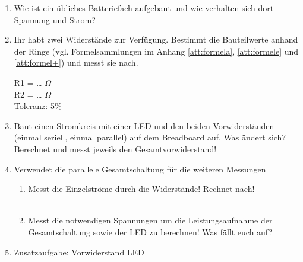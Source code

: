 
\begin{enumerate}
  \item Wie ist ein übliches Batteriefach aufgebaut und wie verhalten sich dort
    Spannung und Strom? \\
  \item Ihr habt zwei Widerstände zur Verfügung. Bestimmt die Bauteilwerte
    anhand der Ringe (vgl. Formelsammlungen im Anhang \ref{att:formela},
    \ref{att:formele} und \ref{att:formel+}) und messt sie nach.
    \begin{center}
    R1 = \dots {} $\Omega$ \\
    R2 = \dots {} $\Omega$ \\
    Toleranz: 5\%
    \end{center}
  \item Baut einen Stromkreis mit einer LED und den beiden Vorwiderständen
    (einmal seriell, einmal parallel) auf dem Breadboard auf. Was ändert sich?
    Berechnet und messt jeweils den Gesamtvorwiderstand! \\
  \item Verwendet die parallele Gesamtschaltung für die weiteren Messungen
    \begin{enumerate}
      \item Messt die Einzelströme durch die Widerstände! Rechnet nach! \\
        \\
      \item Messt die notwendigen Spannungen um die Leistungsaufnahme der
        Gesamtschaltung sowie der LED zu berechnen! Was fällt euch auf? \\
    \end{enumerate}
  \item Zusatzaufgabe: Vorwiderstand LED\\ %

\end{enumerate}

